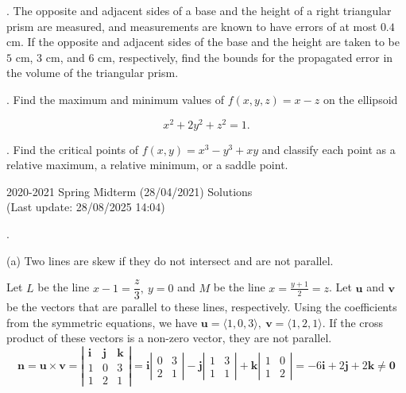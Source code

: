 \documentclass{article}
\begin{document}
\hfill

. The opposite and adjacent sides of a base and the height of a right triangular prism are measured, and measurements are known to have errors of at most $0.4$ cm. If the opposite and adjacent sides of the base and the height are taken to be $5$ cm, $3$ cm, and $6$ cm, respectively, find the bounds for the propagated error in the volume of the triangular prism.

\hfill

. Find the maximum and minimum values of $f(x,y,z)=x-z$ on the ellipsoid

\[x^2+2y^2+z^2=1.\]

\hfill

. Find the critical points of $f(x,y)=x^3-y^3+xy$ and classify each point as a relative maximum, a relative minimum, or a saddle point.

\newpage

\begin{center}
2020-2021 Spring Midterm (28/04/2021) Solutions\\
(Last update: 28/08/2025 14:04)
\end{center}

.

\hfill

\noindent (a) Two lines are skew if they do not intersect and are not parallel.

\hfill

\noindent Let $L$ be the line $x-1=\dfrac z3,\: y=0$  and $M$ be the line $\displaystyle x=\frac{y+1}2=z$. Let $\mathbf u$ and $\mathbf v$ be the vectors that are parallel to these lines, respectively. Using the coefficients from the symmetric equations, we have $\mathbf u=\langle1,0,3\rangle, \:\mathbf v= \langle1,2,1\rangle$. If the cross product of these vectors is a non-zero vector, they are not parallel.
\[\mathbf{n}=\mathbf{u}\times\mathbf{v}=\left|\begin{array}{ccc}
\mathbf{i}&\mathbf{j}&\mathbf{k}\\
1&0&3\\
1&2&1
\end{array}\right|=\mathbf{i}\left|\begin{array}{cc}
0&3\\2&1
\end{array}\right|-\mathbf{j}\left|\begin{array}{cc}
1&3\\1&1
\end{array}\right|+\mathbf{k}\left|\begin{array}{cc}
1&0\\1&2
\end{array}\right|=-6\mathbf{i}+2\mathbf{j}+2\mathbf{k}\neq\mathbf{0}\]
\end{document}
